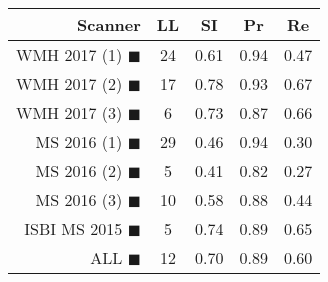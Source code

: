 \begin{tabular}{rcccc}
\toprule
Scanner & LL & SI & Pr & Re \\
\midrule
WMH 2017 (1) {\color[rgb]{ 1.00 0.00 0.00}$\blacksquare$} & 24 & 0.61 & 0.94 & 0.47 \\
WMH 2017 (2) {\color[rgb]{ 1.00 0.50 0.00}$\blacksquare$} & 17 & 0.78 & 0.93 & 0.67 \\
WMH 2017 (3) {\color[rgb]{ 1.00 0.80 0.00}$\blacksquare$} & 6 & 0.73 & 0.87 & 0.66 \\
MS  2016 (1) {\color[rgb]{ 0.20 0.80 0.00}$\blacksquare$} & 29 & 0.46 & 0.94 & 0.30 \\
MS  2016 (2) {\color[rgb]{ 0.00 0.40 1.00}$\blacksquare$} & 5 & 0.41 & 0.82 & 0.27 \\
MS  2016 (3) {\color[rgb]{ 0.60 0.00 1.00}$\blacksquare$} & 10 & 0.58 & 0.88 & 0.44 \\
ISBI MS 2015 {\color[rgb]{ 1.00 0.00 1.00}$\blacksquare$} & 5 & 0.74 & 0.89 & 0.65 \\
\midrule
ALL {\color[rgb]{ 1.00 1.00 1.00}$\blacksquare$} & 12 & 0.70 & 0.89 & 0.60 \\
\bottomrule
\end{tabular}